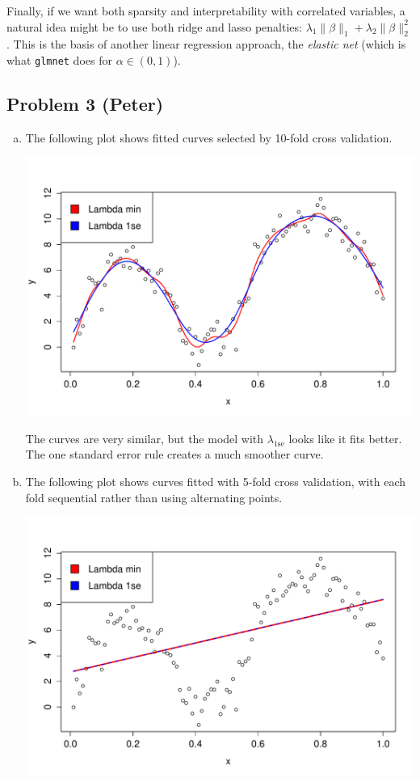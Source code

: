\documentclass[12pt]{article}
\newcommand{\1}{\mathbbm{1}}
\begin{document}
\begin{enumerate}
Finally, if we want both sparsity and interpretability with correlated
variables, a natural idea might be to use both ridge and lasso penalties:
$\lambda_1 \|\beta\|_1 + \lambda_2 \|\beta\|_2^2$. This is the basis of another
linear regression approach, the \emph{elastic net} (which is what
\texttt{glmnet} does for $\alpha \in (0,1)$).
\end{enumerate}

\newpage
\subsection{Problem 3 (Peter)}
\begin{enumerate}[(a)]
\item The following plot shows fitted curves selected by 10-fold cross validation.
\begin{center}
\includegraphics[width=5in]{prob3_a_1.pdf}
\end{center}
The curves are very similar, but the model with $\lambda_{1\text{se}}$ looks like it fits better. The one standard error rule creates a much smoother curve.
\item The following plot shows curves fitted with 5-fold cross validation, with each fold sequential rather than using alternating points.
\begin{center}
\includegraphics[width=5in]{prob3_b_1.pdf}

\end{center}
\end{enumerate}
\end{document}
